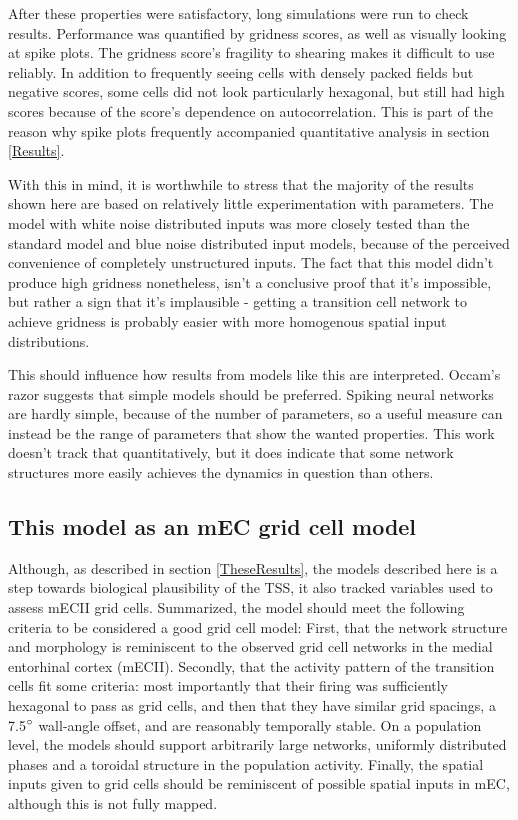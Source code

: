 \documentclass{article}
\begin{document}
    After these properties were satisfactory, long simulations were run to check results. Performance was quantified by gridness scores, as well as visually looking at spike plots. The gridness score's fragility to shearing makes it difficult to use reliably. In addition to frequently seeing cells with densely packed fields but negative scores, some cells did not look particularly hexagonal, but still had high scores because of the score's dependence on autocorrelation. This is part of the reason why spike plots frequently accompanied quantitative analysis in section \ref{Results}.

    With this in mind, it is worthwhile to stress that the majority of the results shown here are based on relatively little experimentation with parameters. The model with white noise distributed inputs was more closely tested than the standard model and blue noise distributed input models, because of the perceived convenience of completely unstructured inputs. The fact that this model didn't produce high gridness nonetheless, isn't a conclusive proof that it's impossible, but rather a sign that it's implausible - getting a transition cell network to achieve gridness is probably easier with more homogenous spatial input distributions.

    This should influence how results from models like this are interpreted. Occam's razor suggests that simple models should be preferred. Spiking neural networks are hardly simple, because of the number of parameters, so a useful measure can instead be the range of parameters that show the wanted properties. This work doesn't track that quantitatively, but it does indicate that some network structures more easily achieves the dynamics in question than others.

    \subsection{This model as an mEC grid cell model} \label{GridCellDiscussion}

    Although, as described in section \ref{TheseResults}, the models described here is a step towards biological plausibility of the TSS, it also tracked variables used to assess mECII grid cells. Summarized, the model should meet the following criteria to be considered a good grid cell model: First, that the network structure and morphology is reminiscent to the observed grid cell networks in the medial entorhinal cortex (mECII). Secondly, that the activity pattern of the transition cells fit some criteria: most importantly that their firing was sufficiently hexagonal to pass as grid cells, and then that they have similar grid spacings, a 7.5\(\degree\) wall-angle offset, and are reasonably temporally stable. On a population level, the models should support arbitrarily large networks, uniformly distributed phases and a toroidal structure in the population activity. Finally, the spatial inputs given to grid cells should be reminiscent of possible spatial inputs in mEC, although this is not fully mapped.
\end{document}
